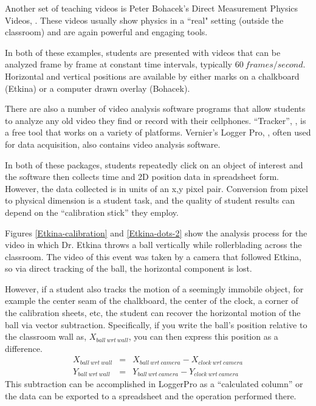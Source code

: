 \documentclass[prb,twocolumn]{revtex4-2}
\newcommand{\bea}{\begin{eqnarray}}
\newcommand{\eea}{\end{eqnarray}}
\begin{document}
Another set of teaching videos is Peter Bohacek's Direct Measurement Physics Videos, \cite{Bohacek_overview} .
These videos usually show physics in a ``real" setting (outside the classroom) and are again powerful and engaging tools.  

In both of these examples, students are presented with videos that can be analyzed frame by frame at constant time intervals, typically $60~frames/second$.  Horizontal and vertical positions are available by either marks on a chalkboard (Etkina) or a computer drawn overlay (Bohacek).  

There are also a number of video analysis software programs that allow students to analyze any old video they find or record with their cellphones.  ``Tracker'', \cite{Tracker}, is a free tool that works on a variety of platforms. Vernier's Logger Pro, \cite{LoggerPro}, often used for data acquisition, also contains video analysis software.  


In both of these packages, students repeatedly click on an object of interest and the software then collects time and 2D position data  in spreadsheet form.  However, the data collected is in units of an x,y pixel pair.  Conversion from pixel to physical dimension is a student task, and the quality of student results can depend on the ``calibration stick''\cite{calibration_stick} they employ.

Figures \ref{Etkina-calibration} and \ref{Etkina-dots-2} show the analysis process for the video in which Dr. Etkina throws a ball vertically while rollerblading across the classroom.  The video of this event was taken by a camera that followed Etkina, so via direct tracking of the ball, the horizontal component is lost.

However, if a student also tracks the motion of a seemingly immobile object, for example the center seam of the chalkboard, the center of the clock, a corner of the calibration sheets, etc, the student can recover the horizontal motion of the ball via vector subtraction.  Specifically, if you write  the ball's position relative to the classroom wall as, $X_{ball~wrt~wall}$, you can then express this position as a difference.
\bea
X_{ball~wrt~wall} &=& X_{ball~wrt~camera}-X_{clock~wrt~camera} \nonumber\\ 
Y_{ball~wrt~wall} &=& Y_{ball~wrt~camera}-Y_{clock~wrt~camera}\nonumber
\eea
This subtraction can be accomplished in LoggerPro as a ``calculated column'' or the data can be exported to a spreadsheet and the operation performed there.  
\end{document}

